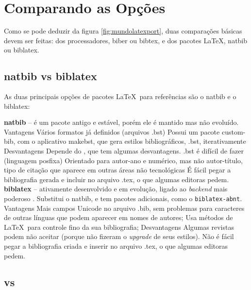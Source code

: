 \section{Comparando as Opções}

Como se pode deduzir da figura \ref{fig:mundolatexport}, duas comparações básicas devem ser feitas: dos processadores, biber ou bibtex, e dos pacotes \LaTeX, natbib ou biblatex.

\subsection{natbib vs biblatex}

As duas principais opções de pacotes \LaTeX\    
para referências são o natbib e o biblatex\parencite{biber:2012}:



\begin{outline}
    \1 \textbf{natbib} -- é um pacote antigo e estável, porém ele é  mantido mas não evoluído. 
    \2 Vantagens
    \3 Vários formatos já definidos (arquivos .bst)
    \3 Possui um pacote custom-bib, com o aplicativo makebst, que gera estilos bibliográficos, .bst, iterativamente
    \2 Desvantagens
    \3 Depende do , que tem algumas desvantagens.
    \3 .bst é difícil de fazer (linguagem posfixa)
    \3 Orientado para autor-ano e numérico, mas não autor-título, tipo de citação que aparece em outras áreas não tecnológicas
    \3 É fácil pegar a bibliografia gerada e incluir no arquivo .tex, o que algumas editoras pedem.
    \1 \textbf{biblatex} -- ativamente desenvolvido e em evolução, ligado
    ao \textit{backend} mais poderoso \hologo{biber}. Substitui o natbib, e tem pacotes adicionais, como o \lstinline|biblatex-abnt|.
    \2 Vantagens
    \3 Mais campos
    \3 Unicode no arquivo .bib, sem problemas para caracteres de outras línguas que podem aparecer em nomes de autores;
    \3 Usa métodos de \LaTeX\ para controle fino da sua bibliografia;
    \2 Desvantagens
    \3 Algumas revistas podem não aceitar (porque não fizeram o
     \textit{upgrade} de seus estilos).
    \3 Não é fácil pegar a bibliografia criada e inserir no arquivo .tex, o que algumas editoras pedem.
\end{outline}


\subsection{ vs }

